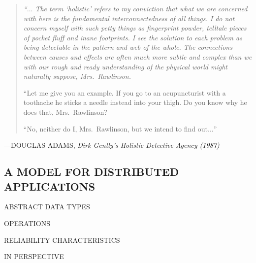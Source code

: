 \begin{bwslide}

\begin{quote}\em
``$\ldots$ The term `holistic' refers to my conviction that what we are
concerned with here is the fundamental interconnectedness of all things.
I do not concern myself with such petty things as fingerprint powder, telltale
pieces of pocket fluff and inane footprints.
I see the solution to each problem as being detectable in the pattern and web
of the whole.
The connections between causes and effects are often much more subtle and
complex than we with our rough and ready understanding of the physical world
might naturally suppose, Mrs.~Rawlinson.

``Let me give you an example.
If you go to an acupuncturist with a toothache he sticks a needle instead into
your thigh.
Do you know why he does that, Mrs.~Rawlinson?

``No, neither do I, Mrs.~Rawlinson, but we intend to find out$\ldots$''
\end{quote}

\raggedright
---DOUGLAS ADAMS, \em Dirk Gently's Holistic Detective Agency (1987)
\end{bwslide}


\begin{bwslide}
\part	{A MODEL FOR DISTRIBUTED APPLICATIONS}\bf

\begin{nrtc}
\item	ABSTRACT DATA TYPES

\item	OPERATIONS

\item	RELIABILITY CHARACTERISTICS

\item	IN PERSPECTIVE
\end{nrtc}
\end{bwslide}


